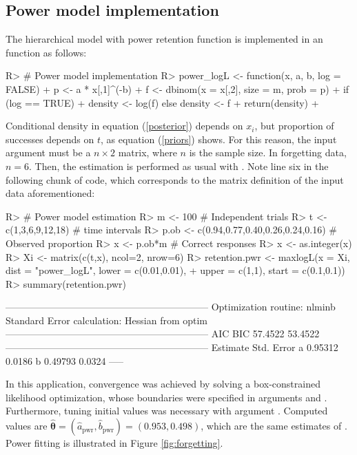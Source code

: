 \documentclass[nojss]{jss}
\begin{document}
\subsection*{Power model implementation}

The hierarchical model with power retention function is implemented in an  function as follows:

\begin{Schunk}
\begin{Sinput}
R> # Power model implementation
R> power_logL <- function(x, a, b, log = FALSE){
+    p <- a * x[,1]^(-b)
+    f <- dbinom(x = x[,2], size = m, prob = p)
+    if (log == TRUE)
+      density <- log(f) else density <- f
+    return(density)
+  }
\end{Sinput}
\end{Schunk}

Conditional density in equation (\ref{posterior}) depends on $x_i$, but proportion of successes depends on $t$, as equation (\ref{priors}) shows. For this reason, the input argument  must be a $n\times 2$ matrix, where $n$ is the sample size. In forgetting data, $n=6$. Then, the estimation is performed as usual with . Note line six in the following chunk of code, which corresponds to the matrix definition of the input data aforementioned:

\begin{Schunk}
\begin{Sinput}
R> # Power model estimation
R> m <- 100 # Independent trials
R> t <- c(1,3,6,9,12,18) # time intervals
R> p.ob <- c(0.94,0.77,0.40,0.26,0.24,0.16) # Observed proportion
R> x <- p.ob*m # Correct responses
R> x <- as.integer(x)
R> Xi <- matrix(c(t,x), ncol=2, nrow=6)
R> retention.pwr <- maxlogL(x = Xi, dist = "power_logL", lower = c(0.01,0.01),
+                           upper = c(1,1), start = c(0.1,0.1))
R> summary(retention.pwr)
\end{Sinput}
\begin{Soutput}
---------------------------------------------------------------
Optimization routine: nlminb 
Standard Error calculation: Hessian from optim 
---------------------------------------------------------------
      AIC     BIC
  57.4522 53.4522
---------------------------------------------------------------
  Estimate  Std. Error
a   0.95312     0.0186
b   0.49793     0.0324
-----
\end{Soutput}
\end{Schunk}

In this application, convergence was achieved by solving a box-constrained likelihood optimization, whose boundaries were specified in arguments  and . Furthermore, tuning initial values was necessary with argument . Computed values are $\hat{\boldsymbol{\theta}}=(\hat{a}_{\text{pwr}},\hat{b}_{\text{pwr}})=(0.953,0.498)$, which are the same estimates of \cite{Myung2003}. Power fitting is illustrated in Figure \ref{fig:forgetting}.
\end{document}
